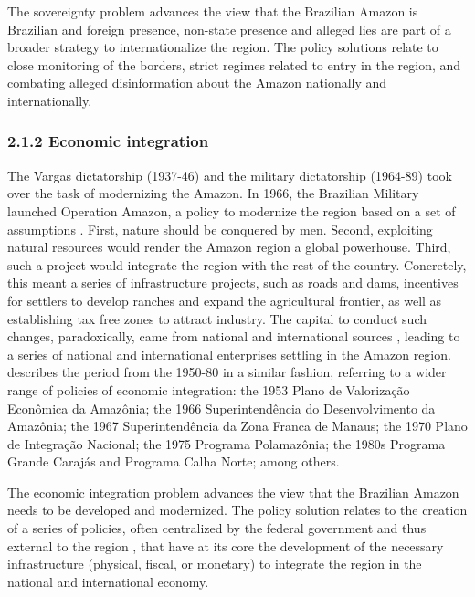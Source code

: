 \documentclass[]{interact}
\theoremstyle{plain}%
\theoremstyle{definition}
\theoremstyle{remark}
\begin{document}
The sovereignty problem advances the view that the Brazilian Amazon is
Brazilian and foreign presence, non-state presence and alleged lies are
part of a broader strategy to internationalize the region. The policy
solutions relate to close monitoring of the borders, strict regimes
related to entry in the region, and combating alleged disinformation
about the Amazon nationally and internationally.

\hypertarget{economic-integration}{%
\subsubsection{2.1.2 Economic integration}\label{economic-integration}}

The Vargas dictatorship (1937-46) and the military dictatorship
(1964-89) took over the task of modernizing the Amazon. In 1966, the
Brazilian Military launched Operation Amazon, a policy to modernize the
region based on a set of assumptions \citep{acker2014}. First, nature
should be conquered by men. Second, exploiting natural resources would
render the Amazon region a global powerhouse. Third, such a project
would integrate the region with the rest of the country. Concretely,
this meant a series of infrastructure projects, such as roads and dams,
incentives for settlers to develop ranches and expand the agricultural
frontier, as well as establishing tax free zones to attract industry.
The capital to conduct such changes, paradoxically, came from national
and international sources \citep{acker2014}, leading to a series of
national and international enterprises settling in the Amazon region.
\citet{capobianco2019} describes the period from the 1950-80 in a
similar fashion, referring to a wider range of policies of economic
integration: the 1953 Plano de Valorização Econômica da Amazônia; the
1966 Superintendência do Desenvolvimento da Amazônia; the 1967
Superintendência da Zona Franca de Manaus; the 1970 Plano de Integração
Nacional; the 1975 Programa Polamazônia; the 1980s Programa Grande
Carajás and Programa Calha Norte; among others.

The economic integration problem advances the view that the Brazilian
Amazon needs to be developed and modernized. The policy solution relates
to the creation of a series of policies, often centralized by the
federal government and thus external to the region \citep{becker2005},
that have at its core the development of the necessary infrastructure
(physical, fiscal, or monetary) to integrate the region in the national
and international economy.
\end{document}
